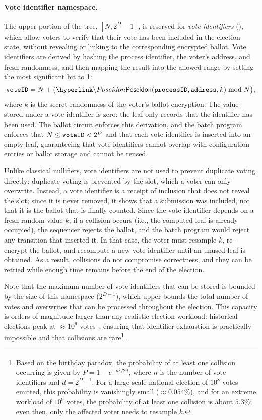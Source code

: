 \paragraph{Vote identifier namespace.}

The upper portion of the tree, $[N, 2^D - 1]$, is reserved for \emph{vote identifiers} (\voteid), which allow voters to verify that their vote has been included in the election state, without revealing or linking to the corresponding encrypted ballot. Vote identifiers are derived by hashing the process identifier, the voter's address, and fresh randomness, and then mapping the result into the allowed range by setting the most significant bit to 1:
\begin{equation}
	\voteid = N + \bigl(\hlget{\Poseidon}(\processid,\address,k) \bmod N\bigr),
	\label{eq:voteid}
\end{equation}
where $k$ is the secret randomness of the voter's ballot encryption. The value stored under a vote identifier is zero: the leaf only records that the identifier has been used. The ballot circuit enforces this derivation, and the batch program enforces that $N \le \texttt{voteID} < 2^D$ and that each vote identifier is inserted into an empty leaf, guaranteeing that vote identifiers cannot overlap with configuration entries or ballot storage and cannot be reused.

Unlike classical nullifiers, vote identifiers are not used to prevent duplicate voting directly: duplicate voting is prevented by the slot, which a voter can only overwrite. Instead, a vote identifier is a receipt of inclusion that does not reveal the slot; since it is never removed, it shows that a submission was included, not that it is the ballot that is finally counted. Since the vote identifier depends on a fresh random value $k$, if a collision occurs (i.e., the computed leaf is already occupied), the sequencer rejects the ballot, and the batch program would reject any transition that inserted it. In that case, the voter must resample $k$, re-encrypt the ballot, and recompute a new vote identifier until an unused leaf is obtained.
As a result, collisions do not compromise correctness, and they can be retried while enough time remains before the end of the election.

Note that the maximum number of vote identifiers that can be stored is bounded by the size of this namespace ($2^{D-1}$),
which upper-bounds the total number of votes and overwrites that can be processed throughout the election.
This capacity is orders of magnitude larger than any realistic election workload: historical elections peak at $\approx 10^{9}$ votes~\cite{reuters2024india}, ensuring that identifier exhaustion is practically impossible and that collisions are rare\footnote{Based on the birthday paradox, the probability of at least one collision occurring is given by $P=1 - e^{-n^2/2d}$, where $n$ is the number of vote identifiers and $d = 2^{D-1}$. For a large-scale national election of $10^8$ votes emitted, this probability is vanishingly small ($\approx0.054\%$), and for an extreme workload of $10^9$ votes, the probability of at least one collision is about $5.3\%$; even then, only the affected voter needs to resample $k$.}.

